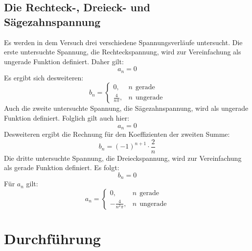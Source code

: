 \documentclass[
  bibliography=totoc,     %
  captions=tableheading,  %
  titlepage=firstiscover, %
]{scrartcl}
\begin{document}
\subsection{Die Rechteck-, Dreieck- und Sägezahnspannung}
\label{sub:formeln}
Es werden in dem Versuch drei verschiedene Spannungsverläufe untersucht.
Die erste untersuchte Spannung, die Rechteckspannung, wird zur Vereinfachung
als ungerade Funktion definiert. Daher gilt:
\begin{equation}
	a_n=0
\end{equation}
Es ergibt sich desweiteren:
\begin{equation}
	b_n=
	\begin{cases}
		0,  & n \:\:\mathup{gerade}\\
		\frac{4}{n\pi}, &n \:\:\mathup{ungerade}
	\end{cases}
  \label{eqn:rechteck}
\end{equation}
Auch die zweite untersuchte Spannung, die Sägezahnspannung, wird als ungerade
Funktion definiert. Folglich gilt auch hier:
\begin{equation}
	a_n=0
\end{equation}
Desweiteren ergibt die Rechnung für den Koeffizienten der zweiten Summe:
\begin{equation}
	b_n=\left( -1 \right)^{n+1} \cdot \frac{2}{n}
  \label{eqn:sägezahn}
\end{equation}
Die dritte untersuchte Spannung, die Dreieckspannung, wird zur Vereinfachung
als gerade Funktion definiert. Es folgt:
\begin{equation}
	b_n=0
\end{equation}
Für $a_n$ gilt:
\begin{equation}
	a_n=
	\begin{cases}
		0,  & n \:\:\mathup{gerade}\\
		-\frac{4}{n^2\pi}, &n \:\:\mathup{ungerade}
	\end{cases}
  \label{eqn:dreieck}
\end{equation}
\clearpage
\section{Durchführung}
\end{document}
